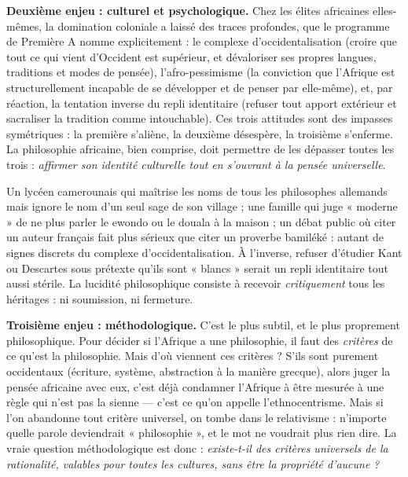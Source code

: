 \documentclass[11pt]{article}
\newcommand{\cle}[1]{{\popxbold\color{popdark}#1}}
\begin{document}
\textbf{Deuxième enjeu : culturel et psychologique.} Chez les élites africaines elles-mêmes, la domination coloniale a laissé des traces profondes, que le programme de Première A nomme explicitement : le \cle{complexe d'occidentalisation} (croire que tout ce qui vient d'Occident est supérieur, et dévaloriser ses propres langues, traditions et modes de pensée), l'\cle{afro-pessimisme} (la conviction que l'Afrique est structurellement incapable de se développer et de penser par elle-même), et, par réaction, la tentation inverse du \cle{repli identitaire} (refuser tout apport extérieur et sacraliser la tradition comme intouchable). Ces trois attitudes sont des impasses symétriques : la première s'aliène, la deuxième désespère, la troisième s'enferme. La philosophie africaine, bien comprise, doit permettre de les dépasser toutes les trois : \emph{affirmer son identité culturelle tout en s'ouvrant à la pensée universelle}.

\begin{exemplebox}
Un lycéen camerounais qui maîtrise les noms de tous les philosophes allemands mais ignore le nom d'un seul sage de son village ; une famille qui juge « moderne » de ne plus parler le ewondo ou le douala à la maison ; un débat public où citer un auteur français fait plus sérieux que citer un proverbe bamiléké : autant de signes discrets du complexe d'occidentalisation. À l'inverse, refuser d'étudier Kant ou Descartes sous prétexte qu'ils sont « blancs » serait un repli identitaire tout aussi stérile. La lucidité philosophique consiste à recevoir \emph{critiquement} tous les héritages : ni soumission, ni fermeture.
\end{exemplebox}

\textbf{Troisième enjeu : méthodologique.} C'est le plus subtil, et le plus proprement philosophique. Pour décider si l'Afrique a une philosophie, il faut des \emph{critères} de ce qu'est la philosophie. Mais d'où viennent ces critères ? S'ils sont purement occidentaux (écriture, système, abstraction à la manière grecque), alors juger la pensée africaine avec eux, c'est déjà condamner l'Afrique à être mesurée à une règle qui n'est pas la sienne — c'est ce qu'on appelle l'\cle{ethnocentrisme}. Mais si l'on abandonne tout critère universel, on tombe dans le relativisme : n'importe quelle parole deviendrait « philosophie », et le mot ne voudrait plus rien dire. La vraie question méthodologique est donc : \emph{existe-t-il des critères universels de la rationalité, valables pour toutes les cultures, sans être la propriété d'aucune ?}
\end{document}
